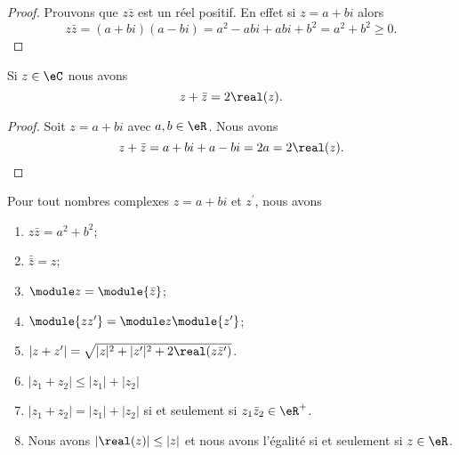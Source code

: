 \begin{proof}
	Prouvons que \( z\bar z\) est un réel positif. En effet si \( z=a+bi\) alors
	\begin{equation}
		z\bar z=(a+bi)(a-bi)=a^2-abi+abi+b^2=a^2+b^2\geq 0.
	\end{equation}
\end{proof}

\begin{lemma}       \label{LEMooJRLWooScVrkG}
	Si \( z\in \eC\) nous avons
	\begin{equation}        \label{EQooQDGTooBejPUE}
		z+\bar z=2\real(z).
	\end{equation}
\end{lemma}

\begin{proof}
	Soit \( z=a+bi\) avec \( a,b\in \eR\). Nous avons
	\begin{equation}
		z+\bar z=a+bi+a-bi=2a=2\real(z).
	\end{equation}
\end{proof}

\begin{proposition}     \label{PROPooUMVGooIrhZZg}
	Pour tout nombres complexes \( z = a+bi\) et \( z^\prime\), nous avons
	\begin{enumerate}
		\item       \label{ITEMooYBJVooGXiDSd}
		      \( z \bar z = a^2 + b^2\);
		\item       \label{ITEMooCGLSooKHbzkn}
		      \( \bar{\bar{z}} = z\);
		\item       \label{ITEMooDKWDooUjEuZA}
		      \( \module z = \module {\bar z}\);
		\item       \label{ITEMooFXKYooUOXbwH}
		      \( \module{zz^\prime} = \module z \module{z^\prime}\);
		\item     \label{ITEMooUJHPooUFdvqB}
		      \( | z+z' |=\sqrt{ | z |^2+| z' |^2+2\real(z\bar z') }\).
		\item       \label{ITEMooDVMDooFDmOur}
		      \( | z_1+z_2 |\leq | z_1 |+| z_2 |\)
		\item     \label{ITEMooHBIEooEhzlwI}
		      \( | z_1+z_2 |=| z_1 |+| z_2 |\) si et seulement si \( z_1\bar z_2\in \eR^+\).
		\item             \label{ITEMooMCAAooTuUxLV}
		      Nous avons \( | \real(z) |\leq | z |\) et nous avons l'égalité si et seulement si \( z\in \eR\).
	\end{enumerate}
\end{proposition}

